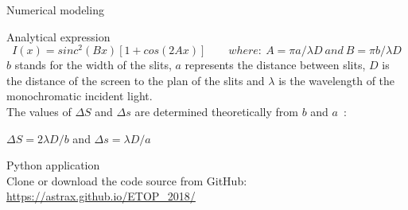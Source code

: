 \documentclass[serif ,mathserif, 8pt]{beamer}
\begin{document}
\begin{frame}{Numerical modeling}
\begin{block}{Analytical expression}
	\begin{equation*}
	I(x) = sinc^2 (Bx)[1+cos(2Ax)] \quad \quad where: \ A = \pi a /\lambda D \ and \ B = \pi b / \lambda D
	\end{equation*}
	$b$ stands for the width of the slits, $a$ represents the distance between slits, $D$ is the distance of the screen to the plan of the slits and $\lambda$ is the wavelength of the monochromatic incident light.\\
	The values of $\Delta S$ and $\Delta s$ are determined theoretically from $b$ and $a$ :\\
	\begin{center}
		$\Delta S=2\lambda D/b$	\quad and \quad $\Delta s=\lambda D/a$
	\end{center}

\end{block}


\end{frame}

\begin{frame}{Python application}
	\centering
	\\
	Clone or download the code source from GitHub:\\
	\url{https://astrax.github.io/ETOP_2018/}	
\end{frame}

\end{document}
